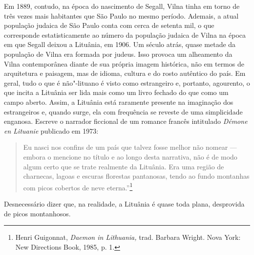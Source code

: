 Em 1889, contudo, na
época do nascimento de Segall, Vilna tinha em torno de três vezes mais
habitantes que São Paulo no mesmo período. Ademais, a atual população
judaica de São Paulo conta com cerca de setenta mil, o que corresponde
estatisticamente ao número da população judaica de Vilna na época em que
Segall deixou a Lituânia, em 1906. Um século atrás, quase metade da
população de Vilna era formada por judeus. Isso provoca um alheamento da
Vilna contemporânea diante de sua própria imagem histórica, não em
termos de arquitetura e paisagem, mas de idioma, cultura e do rosto
autêntico do país. Em geral, tudo o que é não"-lituano é visto como
estrangeiro e, portanto, agourento, o que incita a Lituânia ser lida
mais como um livro fechado do que como um campo aberto. Assim, a
Lituânia está raramente presente na imaginação dos estrangeiros e,
quando surge, ela com frequência se reveste de uma simplicidade
enganosa. Escreve o narrador ficcional de um romance
francês intitulado \textit{Démone en Lituanie} publicado em 1973: 

\begin{quote}
Eu nasci nos
confins de um país que talvez fosse melhor não nomear --- embora o
mencione no título e ao longo desta narrativa, não é de modo algum certo
que se trate realmente da Lituânia. Era uma região de charnecas, lagoas
e escuras florestas pantanosas, tendo ao fundo montanhas com picos
cobertos de neve eterna.''\footnote{Henri Guigonnat, \textit{Daemon in
  Lithuania,} trad. Barbara Wright. Nova York: New Directions Book,
  1985, p. 1.} 
\end{quote}

Desnecessário dizer que, na realidade, a Lituânia é quase
toda plana, desprovida de picos montanhosos.


